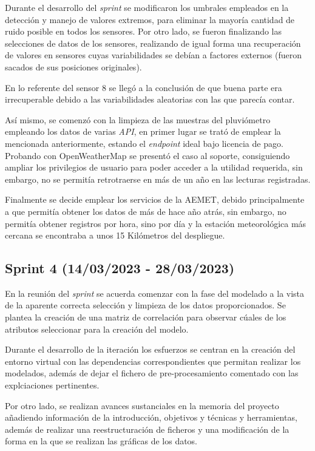 Durante el desarrollo del \textit{sprint} se modificaron los umbrales empleados en la detección y manejo de valores extremos, para eliminar la mayoría
cantidad de ruido posible en todos los sensores.
Por otro lado, se fueron finalizando las selecciones de datos de los sensores, realizando de igual forma una recuperación de valores en sensores cuyas 
variabilidades se debían a factores externos (fueron sacados de sus posiciones originales).

En lo referente del sensor 8 se llegó a la conclusión de que buena parte era irrecuperable debido a las variabilidades aleatorias 
con las que parecía contar.

Así mismo, se comenzó con la limpieza de las muestras del pluviómetro empleando los datos de varias \textit{API}, en primer lugar se trató de emplear
la mencionada anteriormente, estando el \textit{endpoint} ideal bajo licencia de pago.
Probando con OpenWeatherMap se presentó el caso al soporte, consiguiendo ampliar los privilegios de usuario para poder acceder a la utilidad requerida, sin embargo, no
se permitía retrotraerse en más de un año en las lecturas registradas.

Finalmente se decide emplear los servicios de la AEMET, debido principalmente a que permitía obtener los datos de más de hace año atrás, sin embargo, no permitía obtener 
registros por hora, sino por día y la estación meteorológica más cercana se encontraba a unos 15 Kilómetros
del despliegue.

\subsection{Sprint 4 (14/03/2023 - 28/03/2023)}
En la reunión del \textit{sprint} se acuerda comenzar con la fase del modelado a la vista de la aparente correcta selección y limpieza de los datos 
proporcionados.
Se plantea la creación de una matriz de correlación para observar cúales de los atributos seleccionar para la creación del modelo.

Durante el desarrollo de la iteración los esfuerzos se centran en la creación del entorno virtual con las dependencias correspondientes que permitan 
realizar los modelados, además de dejar el fichero de pre-procesamiento comentado con las explciaciones pertinentes.

Por otro lado, se realizan avances sustanciales en la memoria del proyecto añadiendo información de la introducción, objetivos y técnicas y herramientas,
además de realizar una reestructuración de ficheros y una modificación de la forma en la que se realizan las gráficas de los datos.

